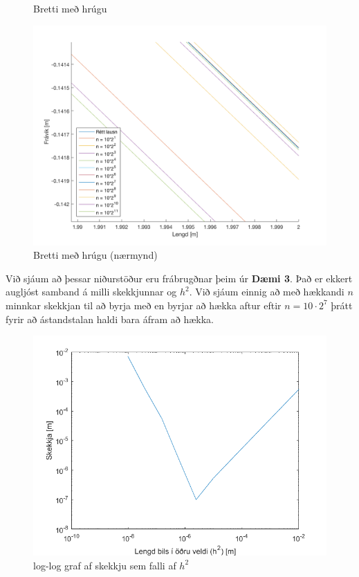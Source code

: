 \documentclass[11pt]{article}
\begin{document}
{\begin{figure}[H]
  \caption{Bretti með hrúgu}
\end{figure}
\begin{figure}[H]
\centering
  \includegraphics[width=5in]{m_hrugu_close.png}
\caption{Bretti með hrúgu (nærmynd)}
\end{figure}
\newpage
Við sjáum að þessar niðurstöður eru frábrugðnar þeim úr \textbf{Dæmi 3}. Það er ekkert augljóst samband á milli skekkjunnar og $h^2$. Við sjáum einnig að með hækkandi $n$ minnkar skekkjan til að byrja með en byrjar að hækka aftur eftir $n=10\cdot 2^7$ þrátt fyrir að ástandstalan haldi bara áfram að hækka.\\
\begin{figure}[H]
\centering
\includegraphics[scale=0.64]{loglogGraf_5_.png}
\caption{log-log graf af skekkju sem falli af $h^2$}
\end{figure}
\newpage
}
\end{document}
